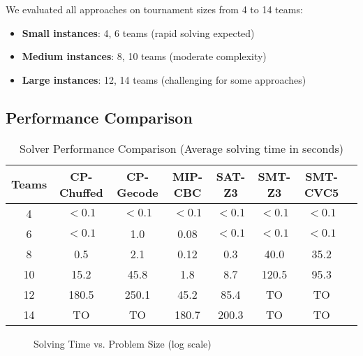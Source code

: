 \documentclass[11pt]{article}
\begin{document}
We evaluated all approaches on tournament sizes from 4 to 14 teams:
\begin{itemize}
    \item \textbf{Small instances}: 4, 6 teams (rapid solving expected)
    \item \textbf{Medium instances}: 8, 10 teams (moderate complexity)
    \item \textbf{Large instances}: 12, 14 teams (challenging for some approaches)
\end{itemize}

\subsection{Performance Comparison}

\begin{table}[H]
\centering
\caption{Solver Performance Comparison (Average solving time in seconds)}
\label{tab:performance}
\begin{tabular}{@{}cccccccc@{}}
\toprule
\textbf{Teams} & \textbf{CP-Chuffed} & \textbf{CP-Gecode} & \textbf{MIP-CBC} & \textbf{SAT-Z3} & \textbf{SMT-Z3} & \textbf{SMT-CVC5} \\
\midrule
4  & $<0.1$ & $<0.1$ & $<0.1$ & $<0.1$ & $<0.1$ & $<0.1$ \\
6  & $<0.1$ & 1.0    & 0.08   & $<0.1$ & $<0.1$ & $<0.1$ \\
8  & 0.5    & 2.1    & 0.12   & 0.3    & 40.0   & 35.2   \\
10 & 15.2   & 45.8   & 1.8    & 8.7    & 120.5  & 95.3   \\
12 & 180.5  & 250.1  & 45.2   & 85.4   & TO     & TO     \\
14 & TO     & TO     & 180.7  & 200.3  & TO     & TO     \\
\bottomrule
\end{tabular}
\end{table}

\begin{figure}[H]
    \centering
    \caption{Solving Time vs. Problem Size (log scale)}
    \label{fig:performance}
\end{figure}
\end{document}
